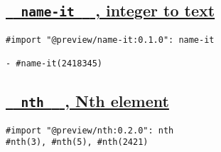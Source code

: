\pandocbounded{}

\subsection{\texorpdfstring{\hyperref[name-it-integer-to-text]{\texttt{\ }{\texttt{\ name-it\ }}\texttt{\ }
, integer to
text}}{  name-it   , integer to text}}\label{name-it-integer-to-text}

\begin{verbatim}
#import "@preview/name-it:0.1.0": name-it

- #name-it(2418345)
\end{verbatim}

\pandocbounded{}

\subsection{\texorpdfstring{\hyperref[nth-nth-element]{\texttt{\ }{\texttt{\ nth\ }}\texttt{\ }
, Nth element}}{  nth   , Nth element}}\label{nth-nth-element}

\begin{verbatim}
#import "@preview/nth:0.2.0": nth
#nth(3), #nth(5), #nth(2421)
\end{verbatim}

\pandocbounded{}
